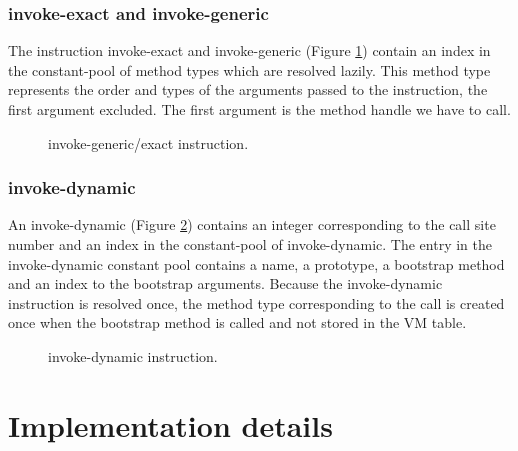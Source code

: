 \documentclass{sig-alternate}
\begin{document}
    \subsubsection{invoke-exact and invoke-generic}

      The instruction invoke-exact and invoke-generic (Figure \ref{INGEins}) contain an index
      in the constant-pool of method types which are resolved lazily.
      This method type represents the order and types of the arguments passed to the instruction, the first argument excluded.
      The first argument is the method handle we have to call.\\

      \begin{figure}[!h]
        \centering \resizebox{1.\linewidth}{!}{}
        \caption{invoke-generic/exact instruction.}\vspace{-1em}
        \label{INGEins}
      \end{figure}

    \subsubsection{invoke-dynamic}

      An invoke-dynamic (Figure \ref{INDYins}) contains an integer corresponding to the call site number
      and an index in the constant-pool of invoke-dynamic.
      The entry in the invoke-dynamic constant pool contains a name, a prototype, a bootstrap method and an index to
      the bootstrap arguments. 
      Because the invoke-dynamic instruction is resolved once, the method type corresponding to the call
      is created once when the bootstrap method is called and not stored in the VM table.

      \begin{figure}[!h]
        \centering \resizebox{1.\linewidth}{!}{}
        \caption{invoke-dynamic instruction.}\vspace{-1em}
        \label{INDYins}
      \end{figure}

\section{Implementation details}
\label{implD}
\end{document}
